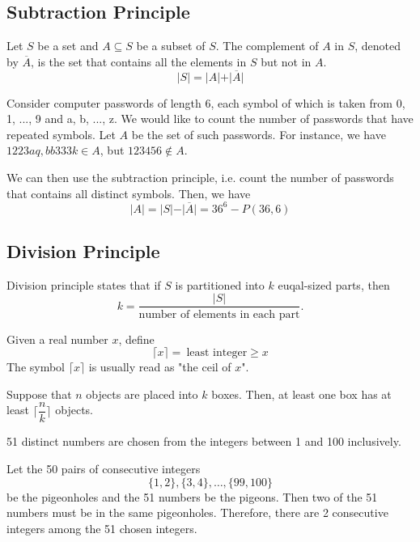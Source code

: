 \subsection{Subtraction Principle}
\begin{definition}
    Let \(S\) be a set and \(A \subseteq S\) be a subset of \(S\). The complement of \(A\) in \(S\), denoted by \(\overline{A}\), is the set that contains all the elements in \(S\) but not in \(A\).
    \[
        \vert S \vert = \vert A \vert + \vert \overline{A} \vert 
    \]
\end{definition}

\begin{eg}
    Consider computer passwords of length 6, each symbol of which is taken from 0, 1, ..., 9 and a, b, ..., z. We would like to count the number of passwords that have repeated symbols. Let \(A\) be the set of such passwords. For instance, we have \(1223aq, bb333k \in A\), but \(123456 \notin A\). 

    We can then use the subtraction principle, i.e. count the number of passwords that contains all distinct symbols. 
    Then, we have
    \[
        \vert A \vert = \vert S \vert - \vert \overline{A} \vert = 36^6 - P(36, 6)
    \]
\end{eg}

\subsection{Division Principle}
Division principle states that if \(S\) is partitioned into \(k\) euqal-sized parts, then
\[
    k = \dfrac{\vert S \vert}{\text{number of elements in each part}}.
\]
\begin{definition}
	Given a real number \(x\), define
	\[
		\lceil x \rceil =\ \text{least integer} \geq x
	\]
	The symbol \(\lceil x \rceil\) is usually read as "the ceil of \(x\)".
\end{definition}

\begin{proposition}
    Suppose that \(n\) objects are placed into \(k\) boxes. Then, at least one box has at least \(\lceil \dfrac{n}{k}\rceil \) objects. 
\end{proposition}
\begin{eg}
    51 distinct numbers are chosen from the integers between 1 and 100 inclusively.

    Let the 50 pairs of consecutive integers
    \[
        \{1, 2\}, \{3, 4\}, \dots, \{99, 100\}
    \]
    be the pigeonholes and the 51 numbers be the pigeons. Then two of the 51 numbers must be in the same pigeonholes. Therefore, there are 2 consecutive integers among the 51 chosen integers.
\end{eg}

